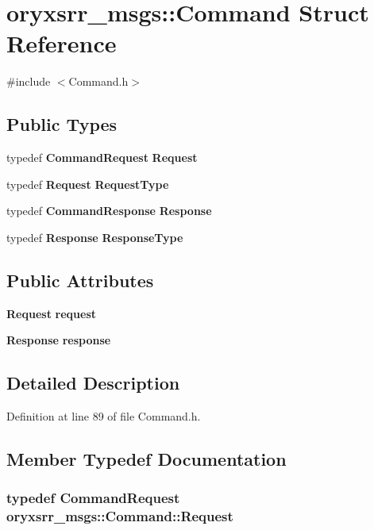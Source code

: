 \section{oryxsrr\-\_\-msgs\-:\-:\-Command \-Struct \-Reference}
\label{structoryxsrr__msgs_1_1Command}


{\ttfamily \#include $<$\-Command.\-h$>$}

\subsection*{\-Public \-Types}
\begin{DoxyCompactItemize}
\item 
typedef {\bf \-Command\-Request} {\bf \-Request}
\item 
typedef {\bf \-Request} {\bf \-Request\-Type}
\item 
typedef {\bf \-Command\-Response} {\bf \-Response}
\item 
typedef {\bf \-Response} {\bf \-Response\-Type}
\end{DoxyCompactItemize}
\subsection*{\-Public \-Attributes}
\begin{DoxyCompactItemize}
\item 
{\bf \-Request} {\bf request}
\item 
{\bf \-Response} {\bf response}
\end{DoxyCompactItemize}


\subsection{\-Detailed \-Description}


\-Definition at line 89 of file \-Command.\-h.



\subsection{\-Member \-Typedef \-Documentation}
\subsubsection[{\-Request}]{\setlength{\rightskip}{0pt plus 5cm}typedef {\bf \-Command\-Request} {\bf oryxsrr\-\_\-msgs\-::\-Command\-::\-Request}}\label{structoryxsrr__msgs_1_1Command_ac5dcb84ff79349dcd3cdc01a1cabfdd1}


